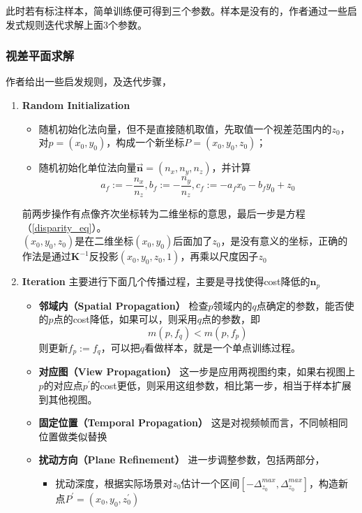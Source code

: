 此时若有标注样本，简单训练便可得到三个参数。样本是没有的，作者通过一些启发式规则迭代求解上面3个参数。

\subsubsection*{视差平面求解}
	作者给出一些启发规则，及迭代步骤，
	\begin{enumerate}
		\item \textbf{Random Initialization} 
			\begin{itemize}
				\item 随机初始化法向量，但不是直接随机取值，先取值一个视差范围内的$z_0$，对$p=(x_0,y_0)$，构成一个新坐标$P=(x_0,y_0,z_0)$；
				\item 随机初始化单位法向量$\overset{\rightarrow}{\mathbf{n}} = (n_x,n_y,n_z)$，并计算
				$$
					a_f := -\frac{n_x}{n_z}, b_f := -\frac{n_y}{n_z}, c_f := -a_fx_0-b_fy_0+z_0
				$$
			\end{itemize}
			前两步操作有点像齐次坐标转为二维坐标的意思，最后一步是方程（\ref{disparity_eq}）。\\

			$(x_0,y_0,z_0)$是在二维坐标$(x_0,y_0)$后面加了$z_0$，是没有意义的坐标，正确的作法是通过$\mathbf{K}^{-1}$反投影$(x_0,y_0,z_0,1)$，再乘以尺度因子$z_0$
		\item \textbf{Iteration} 主要进行下面几个传播过程，主要是寻找使得cost降低的$\mathbf{n}_p$
			\begin{itemize}
				\item \textbf{邻域内（Spatial Propagation）} 检查$p$领域内的$q$点确定的参数，能否使的$p$点的cost降低，如果可以，则采用$q$点的参数，即
				$$
					m(p,f_q) < m(p,f_p)
				$$
				则更新$f_p:=f_q$，可以把$q$看做样本，就是一个单点训练过程。

				\item \textbf{对应图（View Propagation）} 这一步是应用两视图约束，如果右视图上$p$的对应点$p^\prime$的cost更低，则采用这组参数，相比第一步，相当于样本扩展到其他视图。

				\item \textbf{固定位置（Temporal Propagation）} 这是对视频帧而言，不同帧相同位置做类似替换

				\item \textbf{扰动方向（Plane Refinement）} 进一步调整参数，包括两部分，
					\begin{itemize}
						\item 扰动深度，根据实际场景对$z_0$估计一个区间$[-\Delta_{z_0}^{max}, \Delta_{z_0}^{max}]$，构造新点$P^\prime=(x_0,y_0,z_0^\prime)$


\end{itemize}
\end{itemize}
\end{enumerate}
